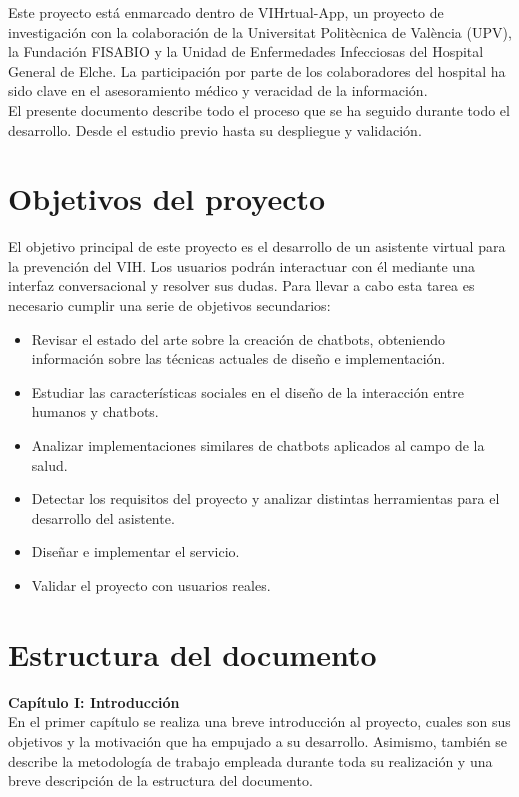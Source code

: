 Este proyecto está enmarcado dentro de VIHrtual-App, un proyecto de investigación con la colaboración de la Universitat Politècnica de València (UPV), la Fundación FISABIO y la Unidad de Enfermedades Infecciosas del Hospital General de Elche. La participación por parte de los colaboradores del hospital ha sido clave en el asesoramiento médico y veracidad de la información.\\ 

El presente documento describe todo el proceso que se ha seguido durante todo el desarrollo. Desde el estudio previo hasta su despliegue y validación.\\

\section{Objetivos del proyecto}
El objetivo principal de este proyecto es el desarrollo de un asistente virtual para la prevención del VIH. Los usuarios podrán interactuar con él mediante una interfaz conversacional y resolver sus dudas. Para llevar a cabo esta tarea es necesario cumplir una serie de objetivos secundarios:\\

\begin{itemize}
	\item Revisar el estado del arte sobre la creación de chatbots, obteniendo información sobre las técnicas actuales de diseño e implementación.
	\item Estudiar las características sociales en el diseño de la interacción entre humanos y chatbots.
	\item Analizar implementaciones similares de chatbots aplicados al campo de la salud.
	\item Detectar los requisitos del proyecto y analizar distintas herramientas para el desarrollo del asistente.
	\item Diseñar e implementar el servicio.
	\item Validar el proyecto con usuarios reales.
\end{itemize}

\section{Estructura del documento}
\noindent \textbf{Capítulo I: Introducción}\\
En el primer capítulo se realiza una breve introducción al proyecto, cuales son sus objetivos y la motivación que ha empujado a su desarrollo. Asimismo, también se describe la metodología de trabajo empleada durante toda su realización y una breve descripción de la estructura del documento.  \\

